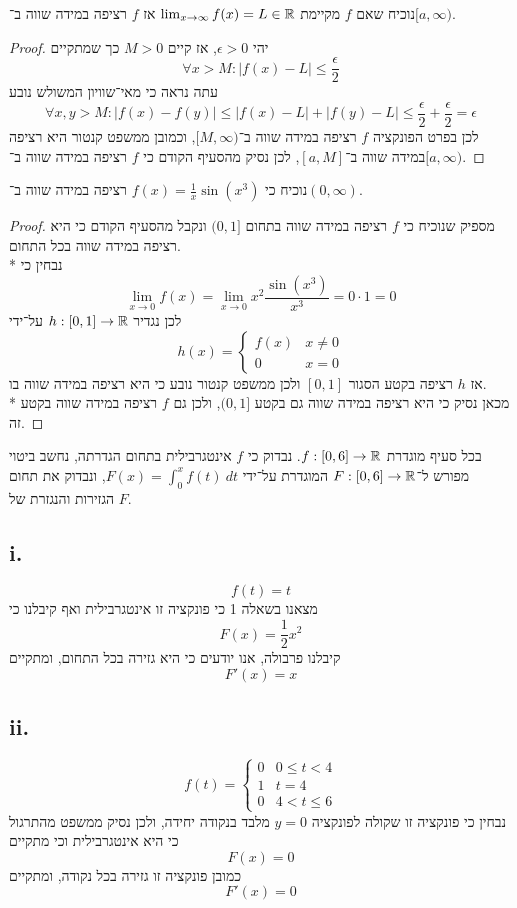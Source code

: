 \Subquestion{}
נוכיח שאם $f$ מקיימת $\lim_{x \to \infty} f(x) = L \in \mathbb{R}$ אז $f$ רציפה במידה שווה ב־$[a, \infty)$.
\begin{proof}
	יהי $\epsilon > 0$, אז קיים $M > 0$ כך שמתקיים
	\[
		\forall x > M : |f(x) - L| \le \frac{\epsilon}{2}
	\]
	עתה נראה כי מאי־שוויון המשולש נובע
	\[
		\forall x, y > M : |f(x) - f(y)| \le |f(x) - L| + |f(y) - L| \le \frac{\epsilon}{2} + \frac{\epsilon}{2} = \epsilon
	\]
	לכן בפרט הפונקציה $f$ רציפה במידה שווה ב־$[M, \infty)$, וכמובן ממשפט קנטור היא רציפה במידה שווה ב־$[a, M]$, לכן נסיק מהסעיף הקודם כי $f$ רציפה במידה שווה ב־$[a, \infty)$.
\end{proof}

\Subquestion{}
נוכיח כי $f(x) = \frac{1}{x} \sin(x^3)$ רציפה במידה שווה ב־$(0, \infty)$.
\begin{proof}
	מספיק שנוכיח כי $f$ רציפה במידה שווה בתחום $(0, 1]$ ונקבל מהסעיף הקודם כי היא רציפה במידה שווה בכל התחום. \\*
	נבחין כי
	\[
		\lim_{x \to 0} f(x)
		= \lim_{x \to 0} x^2 \frac{\sin(x^3)}{x^3}
		= 0 \cdot 1
		= 0
	\]
	לכן נגדיר $h : [0, 1] \to \mathbb{R}$ על־ידי
	\[
		h(x) = \begin{cases}
			f(x) & x \ne 0 \\
			0 & x = 0
		\end{cases}
	\]
	אז $h$ רציפה בקטע הסגור $[0, 1]$ ולכן ממשפט קנטור נובע כי היא רציפה במידה שווה בו. \\*
	מכאן נסיק כי היא רציפה במידה שווה גם בקטע $(0, 1]$, ולכן גם $f$ רציפה במידה שווה בקטע זה.
\end{proof}

\Question{}
בכל סעיף מוגדרת $f : [0, 6] \to \mathbb{R}$. נבדוק כי $f$ אינטגרבילית בתחום הגדרתה, נחשב ביטוי מפורש ל־$F : [0, 6] \to \mathbb{R}$ המוגדרת על־ידי $F(x) = \int_{0}^{x} f(t)\ dt$, ונבדוק את תחום הגזירות והנגזרת של $F$.

\subsection{i.}
\[
	f(t) = t
\]
מצאנו בשאלה 1 כי פונקציה זו אינטגרבילית ואף קיבלנו כי
\[
	F(x) = \frac{1}{2} x^2
\]
קיבלנו פרבולה, אנו יודעים כי היא גזירה בכל התחום, ומתקיים
\[
	F'(x) = x
\]

\subsection{ii.}
\[
	f(t) = \begin{cases}
		0 & 0 \le t < 4 \\
		1 & t = 4 \\
		0 & 4 < t \le 6
	\end{cases}
\]
נבחין כי פונקציה זו שקולה לפונקציה $y = 0$ מלבד בנקודה יחידה, ולכן נסיק ממשפט מהתרגול כי היא אינטגרבילית וכי מתקיים
\[
	F(x) = 0
\]
כמובן פונקציה זו גזירה בכל נקודה, ומתקיים
\[
	F'(x) = 0
\]

